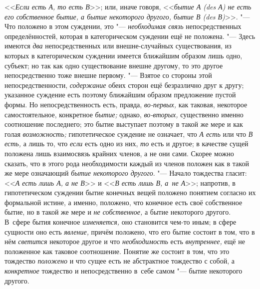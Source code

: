 <<{\em Если есть А, то есть В}>>; или, иначе говоря,
<<{\em бытие А (des А) не есть его
собственное бытие, а бытие некоторого другого, бытие В (des В)}>>. "---
Что положено в этом суждении, это "--- {\em необходимая связь}
непосредственных определённостей, которая в категорическом
суждении ещё не положена. "--- Здесь имеются {\em два}
непосредственных или внешне-случайных существования, из
которых в категорическом суждении имеется ближайшим образом лишь одно,
субъект; но так как одно существование внешне другому, то это другое
непосредственно тоже внешне первому. "--- Взятое со стороны
этой непосредственности, {\em содержание} обеих
сторон ещё безразлично друг к другу; указанное суждение есть поэтому
ближайшим образом предложение пустой формы. Но непосредственность есть,
правда, {\em во-первых,} как таковая, некоторое самостоятельное, конкретное
{\em бытие;} однако, {\em во-вторых,}
существенно именно соотношение последнего; это бытие
выступает поэтому в такой же мере и как голая {\em возможность;}
гипотетическое суждение не означает, что {\em А есть} или что
{\em В есть,} а лишь то, что {\em если} есть одно из них, {\em то} есть и
другое; в качестве сущей положена лишь взаимосвязь крайних членов, а не они
сами. Скорее можно сказать, что в этого рода необходимости каждый из членов
положен как в такой же мере означающий {\em бытие некоторого другого}. "---
Начало тождества гласит: <<{\em А есть лишь А, а не В}>> и <<{\em В есть лишь
В, а~не А}>>; напротив, в гипотетическом суждении бытие конечных
вещей положено понятием согласно их формальной истине, а именно, положено,
что конечное есть своё собственное бытие, но в такой же мере и
{\em не собственное,} а бытие некоторого другого. В~сфере бытия конечное
{\em изменяется,} оно становится чем-то иным; в сфере сущности оно есть
{\em явление,} причём положено, что его бытие состоит в том, что в нём
{\em светится} некоторое другое и что {\em необходимость} есть
{\em внутреннее,} ещё не положенное как таковое соотношение. Понятие же
состоит в том, что это тождество {\em положено}
и что сущее есть не абстрактное тождество с собой, а {\em конкретное}
тождество и непосредственно в~себе самом "--- бытие некоторого другого.

